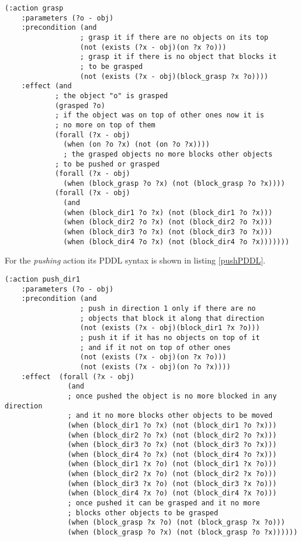\lstset{language=pddl}
\begin{lstlisting}[caption={PDDL syntax of the grasping action},label=graspPDDL]
(:action grasp
    :parameters (?o - obj)
    :precondition (and
                  ; grasp it if there are no objects on its top
                  (not (exists (?x - obj)(on ?x ?o)))
                  ; grasp it if there is no object that blocks it
                  ; to be grasped
                  (not (exists (?x - obj)(block_grasp ?x ?o))))
    :effect (and
            ; the object "o" is grasped
            (grasped ?o)
            ; if the object was on top of other ones now it is
            ; no more on top of them
            (forall (?x - obj)
              (when (on ?o ?x) (not (on ?o ?x))))
              ; the grasped objects no more blocks other objects 
            ; to be pushed or grasped
            (forall (?x - obj)
              (when (block_grasp ?o ?x) (not (block_grasp ?o ?x))))
            (forall (?x - obj)
              (and
              (when (block_dir1 ?o ?x) (not (block_dir1 ?o ?x)))
              (when (block_dir2 ?o ?x) (not (block_dir2 ?o ?x)))
              (when (block_dir3 ?o ?x) (not (block_dir3 ?o ?x)))
              (when (block_dir4 ?o ?x) (not (block_dir4 ?o ?x)))))))
\end{lstlisting}

For the \textit{pushing} action its PDDL syntax is shown in listing \ref{pushPDDL}.

\lstset{language=pddl}
\begin{lstlisting}[caption={PDDL syntax of the pushing action along direction 1},label=pushPDDL]
(:action push_dir1
    :parameters (?o - obj)
    :precondition (and
                  ; push in direction 1 only if there are no
                  ; objects that block it along that direction
                  (not (exists (?x - obj)(block_dir1 ?x ?o)))
                  ; push it if it has no objects on top of it
                  ; and if it not on top of other ones
                  (not (exists (?x - obj)(on ?x ?o)))
                  (not (exists (?x - obj)(on ?o ?x))))
    :effect  (forall (?x - obj)
               (and
               ; once pushed the object is no more blocked in any direction
               ; and it no more blocks other objects to be moved
               (when (block_dir1 ?o ?x) (not (block_dir1 ?o ?x)))
               (when (block_dir2 ?o ?x) (not (block_dir2 ?o ?x)))
               (when (block_dir3 ?o ?x) (not (block_dir3 ?o ?x)))
               (when (block_dir4 ?o ?x) (not (block_dir4 ?o ?x)))
               (when (block_dir1 ?x ?o) (not (block_dir1 ?x ?o)))
               (when (block_dir2 ?x ?o) (not (block_dir2 ?x ?o)))
               (when (block_dir3 ?x ?o) (not (block_dir3 ?x ?o)))
               (when (block_dir4 ?x ?o) (not (block_dir4 ?x ?o)))
               ; once pushed it can be grasped and it no more
               ; blocks other objects to be grasped
               (when (block_grasp ?x ?o) (not (block_grasp ?x ?o)))
               (when (block_grasp ?o ?x) (not (block_grasp ?o ?x))))))
\end{lstlisting}

